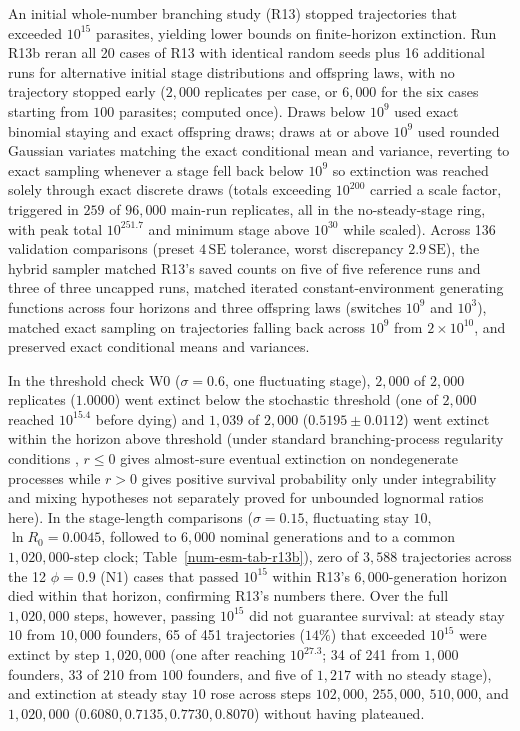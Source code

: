 An initial whole-number branching study (R13) stopped trajectories that exceeded $10^{15}$ parasites, yielding lower bounds on finite-horizon extinction. Run R13b reran all 20 cases of R13 with identical random seeds plus 16 additional runs for alternative initial stage distributions and offspring laws, with no trajectory stopped early ($2{,}000$ replicates per case, or $6{,}000$ for the six cases starting from $100$ parasites; computed once). Draws below $10^9$ used exact binomial staying and exact offspring draws; draws at or above $10^9$ used rounded Gaussian variates matching the exact conditional mean and variance, reverting to exact sampling whenever a stage fell back below $10^9$ so extinction was reached solely through exact discrete draws (totals exceeding $10^{200}$ carried a scale factor, triggered in $259$ of $96{,}000$ main-run replicates, all in the no-steady-stage ring, with peak total $10^{251.7}$ and minimum stage above $10^{30}$ while scaled). Across 136 validation comparisons (preset $4\,\mathrm{SE}$ tolerance, worst discrepancy $2.9\,\mathrm{SE}$), the hybrid sampler matched R13's saved counts on five of five reference runs and three of three uncapped runs, matched iterated constant-environment generating functions across four horizons and three offspring laws (switches $10^9$ and $10^3$), matched exact sampling on trajectories falling back across $10^9$ from $2 \times 10^{10}$, and preserved exact conditional means and variances.

In the threshold check W0 ($\sigma = 0.6$, one fluctuating stage), $2{,}000$ of $2{,}000$ replicates ($1.0000$) went extinct below the stochastic threshold (one of $2{,}000$ reached $10^{15.4}$ before dying) and $1{,}039$ of $2{,}000$ ($0.5195 \pm 0.0112$) went extinct within the horizon above threshold (under standard branching-process regularity conditions \citep{athreya1971,tanny1981}, $r \le 0$ gives almost-sure eventual extinction on nondegenerate processes while $r > 0$ gives positive survival probability only under integrability and mixing hypotheses not separately proved for unbounded lognormal ratios here). In the stage-length comparisons ($\sigma = 0.15$, fluctuating stay $10$, $\ln R_0 = 0.0045$, followed to $6{,}000$ nominal generations and to a common $1{,}020{,}000$-step clock; Table~\ref{num-esm-tab-r13b}), zero of $3{,}588$ trajectories across the 12 $\phi = 0.9$ (N1) cases that passed $10^{15}$ within R13's $6{,}000$-generation horizon died within that horizon, confirming R13's numbers there. Over the full $1{,}020{,}000$ steps, however, passing $10^{15}$ did not guarantee survival: at steady stay $10$ from $10{,}000$ founders, 65 of 451 trajectories ($14\%$) that exceeded $10^{15}$ were extinct by step $1{,}020{,}000$ (one after reaching $10^{27.3}$; 34 of 241 from $1{,}000$ founders, 33 of 210 from $100$ founders, and five of $1{,}217$ with no steady stage), and extinction at steady stay $10$ rose across steps $102{,}000$, $255{,}000$, $510{,}000$, and $1{,}020{,}000$ ($0.6080, 0.7135, 0.7730, 0.8070$) without having plateaued.

